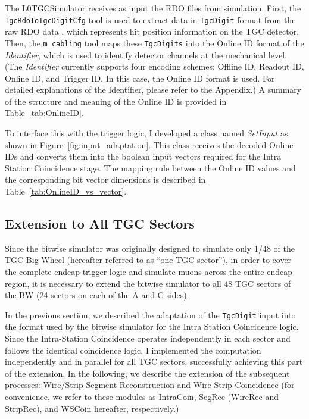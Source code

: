 The L0TGCSimulator receives as input the RDO files from simulation. First, the \\\texttt{TgcRdoToTgcDigitCfg} tool is used to extract data in \texttt{TgcDigit} format from the raw RDO data , which represents hit position information on the TGC detector. Then, the \texttt{m\_cabling} tool maps these \texttt{TgcDigits} into the Online ID format of the \textit{Identifier}, which is used to identify detector channels at the mechanical level. (The \textit{Identifier} currently supports four encoding schemes: Offline ID, Readout ID, Online ID, and Trigger ID. In this case, the Online ID format is used. For detailed explanations of the Identifier, please refer to the Appendix.) A summary of the structure and meaning of the Online ID is provided in Table~\ref{tab:OnlineID}.


To interface this with the trigger logic, I developed a class named \textit{SetInput} as shown in Figure~\ref{fig:input_adaptation}. This class receives the decoded Online IDs and converts them into the boolean input vectors required for the Intra Station Coincidence stage. The mapping rule between the Online ID values and the corresponding bit vector dimensions is described in Table~\ref{tab:OnlineID_vs_vector}.


\subsection{Extension to All TGC Sectors} \label{subsec:Extension}
Since the bitwise simulator was originally designed to simulate only 1/48 of the TGC Big Wheel (hereafter referred to as “one TGC sector”), in order to cover the complete endcap trigger logic and simulate muons across the entire endcap region, it is necessary to extend the bitwise simulator to all 48 TGC sectors of the BW (24 sectors on each of the A and C sides).

In the previous section, we described the adaptation of the \texttt{TgcDigit} input into the format used by the bitwise simulator for the Intra Station Coincidence logic. Since the Intra-Station Coincidence operates independently in each sector and follows the identical coincidence logic, I implemented the computation independently and in parallel for all TGC sectors, successfully achieving this part of the extension. In the following, we describe the extension of the subsequent processes: Wire/Strip Segment Reconstruction and Wire-Strip Coincidence (for convenience, we refer to these modules as IntraCoin, SegRec (WireRec and StripRec), and WSCoin hereafter, respectively.)

